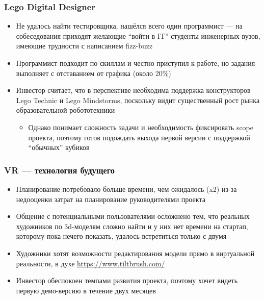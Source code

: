 \documentclass[xetex,mathserif,serif]{beamer}
\begin{document}
	\begin{frame}
		\frametitle{Lego Digital Designer}
		\begin{itemize}
			\item Не удалось найти тестировщика, нашёлся всего один программист --- на собеседования приходят желающие ``войти в IT'' студенты инженерных вузов, имеющие трудности с написанием fizz-buzz
			\item Программист подходит по скиллам и честно приступил к работе, но задания выполняет с отставанием от графика (около 20\%)
			\item Инвестор считает, что в перспективе необходима поддержка конструкторов Lego Technic и Lego Mindstorms, поскольку видит существенный рост рынка образовательной робототехники
			\begin{itemize}
				\item Однако понимает сложность задачи и необходимость фиксировать scope проекта, поэтому готов подождать выхода первой версии с поддержкой ``обычных'' кубиков
			\end{itemize}
		\end{itemize}
	\end{frame}

	\begin{frame}
		\frametitle{VR --- технология будущего}
		\begin{itemize}
			\item Планирование потребовало больше времени, чем ожидалось (x2) из-за недооценки затрат на планирование руководителями проекта
			\item Общение с потенциальными пользователями осложнено тем, что реальных художников по 3d-моделям сложно найти и у них нет времени на стартап, которому пока нечего показать, удалось встретиться только с двумя
			\item Художники хотят возможности редактирования модели прямо в виртуальной реальности, в духе \url{https://www.tiltbrush.com/}
			\item Инвестор обеспокоен темпами развития проекта, поэтому хочет видеть первую демо-версию в течение двух месяцев
		\end{itemize}
	\end{frame}
\end{document}
